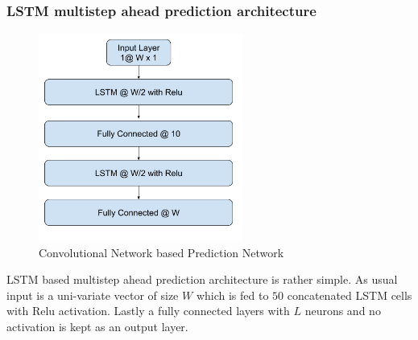 \documentclass[12pt]{article}
\begin{document}
\subsubsection{LSTM multistep ahead prediction architecture}
\begin{figure}[H]
\centering
        \includegraphics[width=0.6\textwidth]{images/architecture/LstmAutoencoder.png}
    \caption{Convolutional Network based Prediction Network}
    \label{generalAnomalyDetectionFrameWork}
\end{figure}

LSTM based multistep ahead prediction architecture is rather simple. As usual input is a uni-variate vector of size  $W$ which is fed to $50$ concatenated LSTM cells with Relu activation. Lastly a fully connected layers with $L$ neurons and no activation is kept as an output layer.
\newpage
\end{document}
